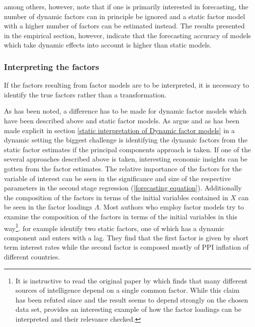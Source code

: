 \documentclass[12pt]{article}
\begin{document}
\citet{breitung2011testing} among others, however, note that if one is primarily interested in forecasting, the number of dynamic factors can in principle be ignored and a static factor model with a higher number of factors can be estimated instead. The results presented in the empirical section, however, indicate that the forecasting accuracy of models which take dynamic effects into account is higher than static models.

\subsubsection{Interpreting the factors}
If the factors resulting from factor models are to be interpreted, it is necessary to identify the true factors rather than a transformation. 

As has been noted, a difference has to be made for dynamic factor models which have been described above and static factor models. As \citet{breitung2004identification} argue and as has been made explicit in section \ref{static interpretation of Dynamic factor models} in a dynamic setting the biggest challenge is identifying the dynamic factors from the static factor estimates if the principal components approach is taken. If one of the several approaches described above is taken, interesting economic insights can be gotten from the factor estimates. The relative importance of the factors for the variable of interest can be seen in the significance and size of the respective parameters in the second stage regression (\ref{forecasting equation}). Additionally the composition of the factors in terms of the initial variables contained in $X$ can be seen in the factor loadings $\Lambda$. Most authors who employ factor models try to examine the composition of the factors in terms of the initial variables in this way\footnote{It is instructive to read the original paper by \citet{spearman1904general} which finds that many different sources of intelligence depend on a single common factor. While this claim has been refuted since and the result seems to depend strongly on the chosen data set, \citet{spearman1904general} provides an interesting example of how the factor loadings can be interpreted and their relevance checked.}. \citet{breitung2004identification} for example identify two static factors, one of which has a dynamic component and enters with a lag. They find that the first factor is given by short term interest rates while the second factor is composed mostly of PPI inflation of different countries.
\end{document}
